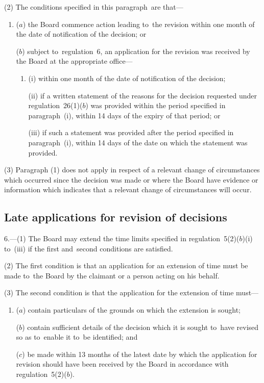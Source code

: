 \documentclass[12pt,a4paper]{article}
\begin{document}
(2) The conditions specified in this paragraph~are that—
\begin{enumerate}\item[]
($a$) the Board commence action leading to~the revision within one month of the date of notification of the decision; or

($b$) subject to~regulation~6, an application for the revision was received by the Board at the appropriate office—
\begin{enumerate}\item[]
(i) within one month of the date of notification of the decision;

(ii) if a written statement of the reasons for the decision requested under regulation~26(1)($b$)  was provided within the period specified in paragraph~(i), within 14 days of the expiry of that period; or

(iii) if such a statement was provided after the period specified in paragraph~(i), within 14 days of the date on which the statement was provided.
\end{enumerate}
\end{enumerate}

(3) Paragraph (1) does not apply in respect of a relevant change of circumstances which occurred since the decision was made or where the Board have evidence or information which indicates that a relevant change of circumstances will occur.

\subsection[6. Late applications for revision of decisions]{Late applications for revision of decisions}

6.---(1)  The Board may extend the time limits specified in regulation~5(2)($b$)(i)  to~(iii)  if the first and~second conditions are satisfied.

(2) The first condition is that an application for an extension of time must be made to~the Board by the claimant or a person acting on his behalf.

(3) The second condition is that the application for the extension of time must—
\begin{enumerate}\item[]
($a$) contain particulars of the grounds on which the extension is sought;

($b$) contain sufficient details of the decision which it is sought to~have revised so as to~enable it to~be identified; and

($c$) be made within 13 months of the latest date by which the application for revision should have been received by the Board in accordance with regulation~5(2)($b$).
\end{enumerate}
\end{document}
